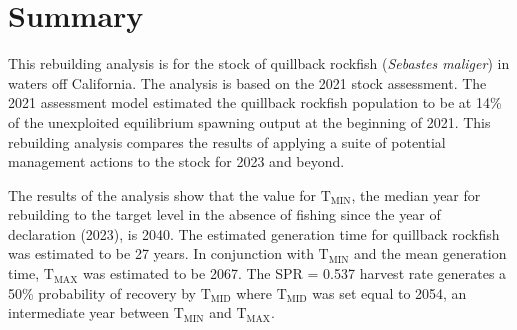\documentclass[11pt,
  english,
  a4paper,
]{article}
\begin{document}
\newcommand{\lt}{\ensuremath <}
\newcommand{\gt}{\ensuremath >}


\pagebreak
{}
\setcounter{page}{1}

\renewcommand{\thetable}{\roman{table}}
\renewcommand{\thefigure}{\roman{figure}}

\setlength\parskip{0.5em plus 0.1em minus 0.2em}


\hypertarget{summary}{%
\section*{Summary}\label{summary}}

\leavevmode\tagmcend\tagstructend


This rebuilding analysis is for the stock of quillback rockfish (\emph{Sebastes maliger}) in waters off California. The analysis is based on the 2021 stock assessment. The 2021 assessment model estimated the quillback rockfish population to be at 14\% of the unexploited equilibrium spawning output at the beginning of 2021. This rebuilding analysis compares the results of applying a suite of potential management actions to the stock for 2023 and beyond.

\leavevmode\tagmcend\tagstructend\par


The results of the analysis show that the value for {\(\text{T}_\text{MIN}\)\leavevmode\tagmcend\tagstructend}, the median year for rebuilding to the target level in the absence of fishing since the year of declaration (2023), is 2040. The estimated generation time for quillback rockfish was estimated to be 27 years. In conjunction with {\(\text{T}_\text{MIN}\)\leavevmode\tagmcend\tagstructend} and the mean generation time, {\(\text{T}_\text{MAX}\)\leavevmode\tagmcend\tagstructend} was estimated to be 2067. The SPR = 0.537 harvest rate generates a 50\% probability of recovery by {\(\text{T}_\text{MID}\)\leavevmode\tagmcend\tagstructend} where {\(\text{T}_\text{MID}\)\leavevmode\tagmcend\tagstructend} was set equal to 2054, an intermediate year between {\(\text{T}_\text{MIN}\)\leavevmode\tagmcend\tagstructend} and {\(\text{T}_\text{MAX}\)\leavevmode\tagmcend\tagstructend}.
\end{document}
